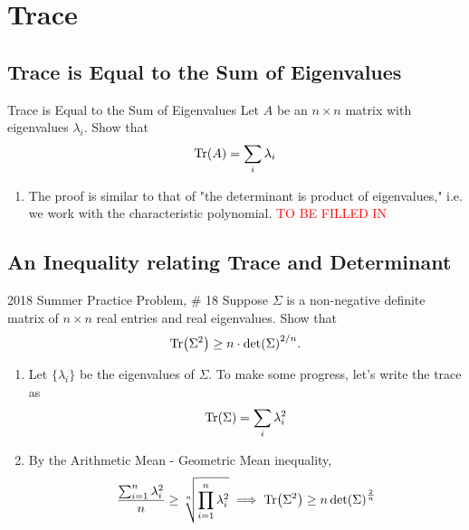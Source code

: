 \documentclass[../main]{subfiles}
\begin{document}
\section{Trace}
\subsection{Trace is Equal to the Sum of Eigenvalues}
\begin{bbox}{Trace is Equal to the Sum of Eigenvalues}
    Let $A$ be an $n\times n$ matrix with eigenvalues $\lambda_i$. Show that 
    \[
    \Tr(A) = \sum_i \lambda_i
    \]
\end{bbox}
\begin{solution}
    \begin{enumerate}
        \item The proof is similar to that of "the determinant is product of eigenvalues," i.e. we work with the characteristic polynomial. \textcolor{red}{TO BE FILLED IN} 
    \end{enumerate}
\end{solution}
\subsection{An Inequality relating Trace and Determinant}
\begin{bbox}{{2018 Summer Practice Problem, \# 18}}
Suppose $\Sigma$ is a non-negative definite matrix of $n\times n$ real entries and real eigenvalues. Show that 
\[
\Tr(\Sigma^2) \geq n \cdot \det(\Sigma)^{2/n}.
\]
\end{bbox}
\begin{solution}
    \begin{enumerate}
        \item Let $\{\lambda_i\}$ be the eigenvalues of $\Sigma$. To make some progress, let's write the trace as 
        \[
        \Tr(\Sigma) = \sum_i \lambda_i^2        
        \]
        \item By the Arithmetic Mean - Geometric Mean inequality,
        \[
        \frac{\sum_{i=1}^n \lambda_i^2}{n} \geq \sqrt[n]{\prod_{i=1}^n \lambda_i^2} \implies \Tr(\Sigma^2) \geq n \det(\Sigma)^{\frac{2}{n}}
        \]
    \end{enumerate}
\end{solution}
\end{document}
